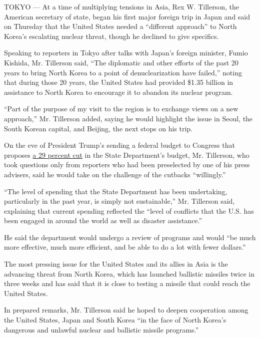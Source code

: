 TOKYO --- At a time of multiplying tensions in Asia, Rex W. Tillerson,
the American secretary of state, began his first major foreign trip in
Japan and said on Thursday that the United States needed a ``different
approach'' to North Korea's escalating nuclear threat, though he
declined to give specifics.

Speaking to reporters in Tokyo after talks with Japan's foreign
minister, Fumio Kishida, Mr. Tillerson said, ``The diplomatic and other
efforts of the past 20 years to bring North Korea to a point of
denuclearization have failed,'' noting that during those 20 years, the
United States had provided \$1.35 billion in assistance to North Korea
to encourage it to abandon its nuclear program.

``Part of the purpose of my visit to the region is to exchange views on
a new approach,'' Mr. Tillerson added, saying he would highlight the
issue in Seoul, the South Korean capital, and Beijing, the next stops on
his trip.

On the eve of President Trump's sending a federal budget to Congress
that proposes
\href{https://www.nytimes3xbfgragh.onion/interactive/2017/03/15/us/politics/trump-budget-proposal.html}{a
29 percent cut} in the State Department's budget, Mr. Tillerson, who
took questions only from reporters who had been preselected by one of
his press advisers, said he would take on the challenge of the cutbacks
``willingly.''

``The level of spending that the State Department has been undertaking,
particularly in the past year, is simply not sustainable,'' Mr.
Tillerson said, explaining that current spending reflected the ``level
of conflicts that the U.S. has been engaged in around the world as well
as disaster assistance.''

He said the department would undergo a review of programs and would ``be
much more effective, much more efficient, and be able to do a lot with
fewer dollars.''

The most pressing issue for the United States and its allies in Asia is
the advancing threat from North Korea, which has launched ballistic
missiles twice in three weeks and has said that it is close to testing a
missile that could reach the United States.

In prepared remarks, Mr. Tillerson said he hoped to deepen cooperation
among the United States, Japan and South Korea ``in the face of North
Korea's dangerous and unlawful nuclear and ballistic missile programs.''

